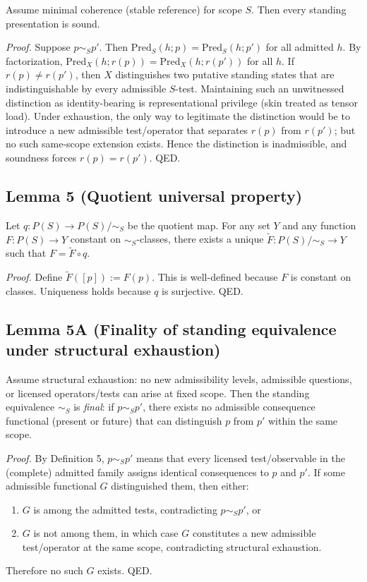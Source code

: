 \documentclass[12pt]{article}
\theoremstyle{plain}
\begin{document}
Assume minimal coherence (stable reference) for scope $S$. Then every standing presentation is sound.

\textit{Proof.} Suppose $p\sim_S p'$. Then $\mathrm{Pred}_S(h;p)=\mathrm{Pred}_S(h;p')$ for all admitted $h$. By factorization, $\mathrm{Pred}_X(h;r(p))=\mathrm{Pred}_X(h;r(p'))$ for all $h$. If $r(p)\neq r(p')$, then $X$ distinguishes two putative standing states that are indistinguishable by every admissible $S$-test. Maintaining such an unwitnessed distinction as identity-bearing is representational privilege (skin treated as tensor load). Under exhaustion, the only way to legitimate the distinction would be to introduce a new admissible test/operator that separates $r(p)$ from $r(p')$; but no such same-scope extension exists. Hence the distinction is inadmissible, and soundness forces $r(p)=r(p')$. QED.

\subsection{Lemma 5 (Quotient universal property)}

Let $q:P(S)\to P(S)/\sim_S$ be the quotient map. For any set $Y$ and any function $F:P(S)\to Y$ constant on $\sim_S$-classes, there exists a unique $\widetilde F:P(S)/\sim_S\to Y$ such that $F=\widetilde F\circ q$.

\textit{Proof.} Define $\widetilde F([p]):=F(p)$. This is well-defined because $F$ is constant on classes. Uniqueness holds because $q$ is surjective. QED.


\subsection{Lemma 5A (Finality of standing equivalence under structural exhaustion)}

Assume structural exhaustion: no new admissibility levels, admissible questions, or licensed operators/tests can arise at fixed scope. Then the standing equivalence $\sim_S$ is \emph{final}: if $p\sim_S p'$, there exists no admissible consequence functional (present or future) that can distinguish $p$ from $p'$ within the same scope.

\textit{Proof.} By Definition 5, $p\sim_S p'$ means that every licensed test/observable in the (complete) admitted family assigns identical consequences to $p$ and $p'$. If some admissible functional $G$ distinguished them, then either:
\begin{enumerate}[leftmargin=*]
\item $G$ is among the admitted tests, contradicting $p\sim_S p'$, or
\item $G$ is not among them, in which case $G$ constitutes a new admissible test/operator at the same scope, contradicting structural exhaustion.
\end{enumerate}
Therefore no such $G$ exists. QED.
\end{document}
